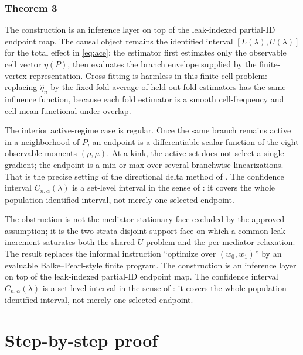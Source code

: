 \documentclass[11pt]{article}
\theoremstyle{definition}
\theoremstyle{plain}
\theoremstyle{remark}
\begin{document}
\subsubsection*{Theorem 3}
The construction is an inference layer on top of the leak-indexed partial-ID endpoint map. The causal object remains the identified interval \([L(\lambda),U(\lambda)]\) for the total effect in \eqref{eq:ace}; the estimator first estimates only the observable cell vector \(\eta(P)\), then evaluates the branch envelope supplied by the finite-vertex representation. Cross-fitting is harmless in this finite-cell problem: replacing \(\widehat\eta_n\) by the fixed-fold average of held-out-fold estimators has the same influence function, because each fold estimator is a smooth cell-frequency and cell-mean functional under overlap.

The interior active-regime case is regular. Once the same branch remains active in a neighborhood of \(P\), an endpoint is a differentiable scalar function of the eight observable moments \((\rho,\mu)\). At a kink, the active set does not select a single gradient; the endpoint is a min or max over several branchwise linearizations. That is the precise setting of the directional delta method of \citet{FangSantos2019DirectionallyDifferentiable}. The confidence interval \(C_{n,\alpha}(\lambda)\) is a set-level interval in the sense of \citet{ChernozhukovHongTamer2007ParameterSets}: it covers the whole population identified interval, not merely one selected endpoint.

The obstruction is not the mediator-stationary face excluded by the approved assumption; it is the two-strata disjoint-support face on which a common leak increment saturates both the shared-\(U\) problem and the per-mediator relaxation. The result replaces the informal instruction ``optimize over \((w_0,w_1)\)'' by an evaluable Balke--Pearl-style finite program. The construction is an inference layer on top of the leak-indexed partial-ID endpoint map. The confidence interval \(C_{n,\alpha}(\lambda)\) is a set-level interval in the sense of \citet{ChernozhukovHongTamer2007ParameterSets}: it covers the whole population identified interval, not merely one selected endpoint.

\section{Step-by-step proof}
\end{document}
